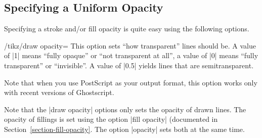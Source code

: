 \subsection{Specifying a Uniform Opacity}

Specifying a stroke and/or fill opacity is quite easy using the following
options.

\begin{key}{/tikz/draw opacity=}
    This option sets ``how transparent'' lines should be. A value of |1| means
    ``fully opaque'' or ``not transparent at all'', a value of |0| means
    ``fully transparent'' or ``invisible''. A value of |0.5| yields lines that
    are semitransparent.

    Note that when you use PostScript as your output format, this option works
    only with recent versions of Ghostscript.
\begin{codeexample}[]
\end{codeexample}
\end{key}

Note that the |draw opacity| options only sets the opacity of drawn lines. The
opacity of fillings is set using the option |fill opacity| (documented in
Section~\ref{section-fill-opacity}. The option |opacity| sets both at the same
time.

